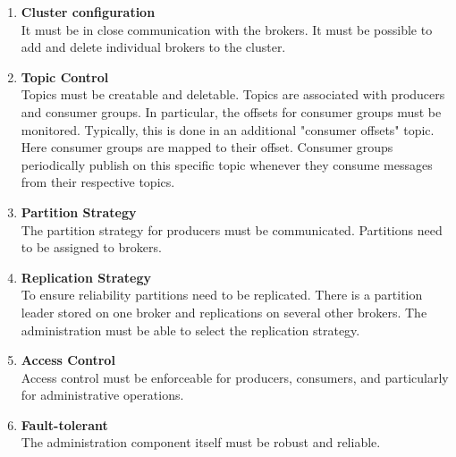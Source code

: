 \begin{enumerate}
   \item \textbf{Cluster configuration}\\It must be in close communication with the brokers. It must be possible to add and delete individual brokers to the cluster.
   \item \textbf{Topic Control}\\Topics must be creatable and deletable. Topics are associated with producers and consumer groups. In particular, the offsets for consumer groups must be monitored. Typically, this is done in an additional "consumer offsets" topic. Here consumer groups are mapped to their offset. Consumer groups periodically publish on this specific topic whenever they consume messages from their respective topics.  
   \item \textbf{Partition Strategy}\\The partition strategy for producers must be communicated. Partitions need to be assigned to brokers. 
   \item \textbf{Replication Strategy}\\To ensure reliability partitions need to be replicated. There is a partition leader stored on one broker and replications on several other brokers. The administration must be able to select the replication strategy.
   \item \textbf{Access Control}\\Access control must be enforceable for producers, consumers, and particularly for administrative operations.  
   \item \textbf{Fault-tolerant}\\The administration component itself must be robust and reliable.
\end{enumerate}

